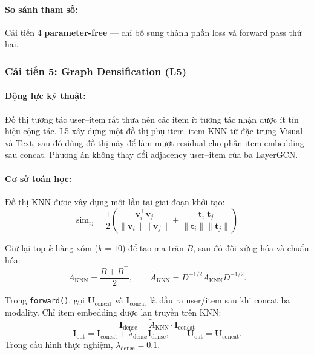 \paragraph{So sánh tham số:}
Cải tiến 4 \textbf{parameter-free} --- chỉ bổ sung thành phần loss và forward pass thứ hai.


\subsubsection{Cải tiến 5: Graph Densification (L5)}

\paragraph{Động lực kỹ thuật:}
Đồ thị tương tác user--item rất thưa nên các item ít tương tác nhận được ít tín hiệu cộng tác. L5 xây dựng một đồ thị phụ item--item KNN từ đặc trưng Visual và Text, sau đó dùng đồ thị này để làm mượt residual cho phần item embedding sau concat. Phương án không thay đổi adjacency user--item của ba LayerGCN.

\paragraph{Cơ sở toán học:}
Đồ thị KNN được xây dựng một lần tại giai đoạn khởi tạo:
\begin{equation}
\text{sim}_{ij} = \frac{1}{2}\left(\frac{\mathbf{v}_i^\top \mathbf{v}_j}{\|\mathbf{v}_i\|\|\mathbf{v}_j\|} + \frac{\mathbf{t}_i^\top \mathbf{t}_j}{\|\mathbf{t}_i\|\|\mathbf{t}_j\|}\right)
\end{equation}

Giữ lại top-$k$ hàng xóm ($k=10$) để tạo ma trận $B$, sau đó đối xứng hóa và chuẩn hóa:
\begin{equation}
A_{\text{KNN}}=\frac{B+B^\top}{2},
\qquad
\tilde{A}_{\text{KNN}}=D^{-1/2}A_{\text{KNN}}D^{-1/2}.
\end{equation}

Trong \texttt{forward()}, gọi $\mathbf U_{\text{concat}}$ và $\mathbf I_{\text{concat}}$ là đầu ra user/item sau khi concat ba modality. Chỉ item embedding được lan truyền trên KNN:
\begin{equation}
\mathbf{I}_{\text{dense}} = \tilde{A}_{\text{KNN}} \cdot \mathbf{I}_{\text{concat}}
\end{equation}
\begin{equation}
\mathbf{I}_{\text{out}} = \mathbf{I}_{\text{concat}} + \lambda_{\text{dense}}\mathbf{I}_{\text{dense}},
\qquad
\mathbf U_{\text{out}}=\mathbf U_{\text{concat}}.
\end{equation}
Trong cấu hình thực nghiệm, $\lambda_{\text{dense}}=0.1$.

